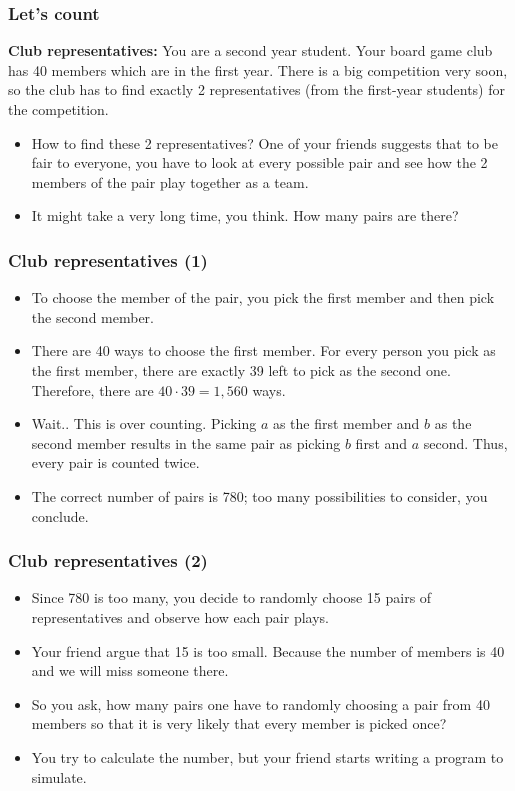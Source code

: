 

\begin{frame}\frametitle{Let's count}
  \begin{tcolorbox}
    {\bf Club representatives:} You are a second year student. Your
    board game club has 40 members which are in the first year.  There
    is a big competition very soon, so the club has to find exactly 2
    representatives (from the first-year students) for the competition.
  \end{tcolorbox}
  \pause

  \begin{itemize}
  \item
    How to find these 2 representatives?  One of your friends suggests
    that to be fair to everyone, you have to look at every possible
    pair and see how the 2 members of the pair play together as a
    team.  \pause
  \item
    It might take a very long time, you think.  How many pairs are
    there?
  \end{itemize}
\end{frame}

\begin{frame}\frametitle{Club representatives (1)}
  \begin{itemize}
  \item
    To choose the member of the pair, you pick the first member and then
    pick the second member.  \pause
  \item There are 40 ways to choose the
    first member. \pause For every person you pick as the first member,
    there are exactly 39 left to pick as the second one. \pause
    Therefore, there are $40\cdot 39 = 1,560$ ways.  \pause
  \item
    Wait.. \pause This is over counting.  Picking $a$ as the first
    member and $b$ as the second member results in the same pair as
    picking $b$ first and $a$ second. \pause Thus, every pair is counted
    twice.  \pause
  \item The correct number of pairs is 780; too many possibilities to
    consider, you conclude.
  \end{itemize}
\end{frame}

\begin{frame}\frametitle{Club representatives (2)}
  \begin{itemize}
  \item Since 780 is too many, you decide to randomly choose 15 pairs
    of representatives and observe how each pair plays.
    \pause
  \item Your friend argue that 15 is too small.  Because the number of
    members is 40 and we will miss someone there.
    \pause
  \item So you ask, how many pairs one have to randomly choosing a
    pair from 40 members so that it is very likely that every member
    is picked once?
    \pause
  \item You try to calculate the number, but your friend starts
    writing a program to simulate.
  \end{itemize}
\end{frame}

